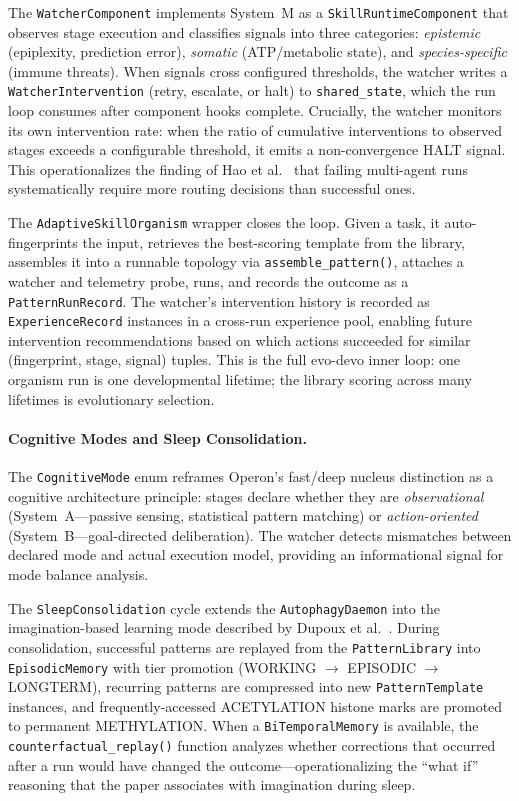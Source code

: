 The \texttt{WatcherComponent} implements System~M as a \texttt{SkillRuntimeComponent} that observes stage execution and classifies signals into three categories: \emph{epistemic} (epiplexity, prediction error), \emph{somatic} (ATP/metabolic state), and \emph{species-specific} (immune threats). When signals cross configured thresholds, the watcher writes a \texttt{WatcherIntervention} (retry, escalate, or halt) to \texttt{shared\_state}, which the run loop consumes after component hooks complete. Crucially, the watcher monitors its own intervention rate: when the ratio of cumulative interventions to observed stages exceeds a configurable threshold, it emits a non-convergence HALT signal. This operationalizes the finding of Hao et al.~\cite{hao2026bigmas} that failing multi-agent runs systematically require more routing decisions than successful ones.

The \texttt{AdaptiveSkillOrganism} wrapper closes the loop. Given a task, it auto-fingerprints the input, retrieves the best-scoring template from the library, assembles it into a runnable topology via \texttt{assemble\_pattern()}, attaches a watcher and telemetry probe, runs, and records the outcome as a \texttt{PatternRunRecord}. The watcher's intervention history is recorded as \texttt{ExperienceRecord} instances in a cross-run experience pool, enabling future intervention recommendations based on which actions succeeded for similar (fingerprint, stage, signal) tuples. This is the full evo-devo inner loop: one organism run is one developmental lifetime; the library scoring across many lifetimes is evolutionary selection.

\paragraph{Cognitive Modes and Sleep Consolidation.}
\label{sec:cognitive-modes}
The \texttt{CognitiveMode} enum reframes Operon's fast/deep nucleus distinction as a cognitive architecture principle: stages declare whether they are \emph{observational} (System~A---passive sensing, statistical pattern matching) or \emph{action-oriented} (System~B---goal-directed deliberation). The watcher detects mismatches between declared mode and actual execution model, providing an informational signal for mode balance analysis.

The \texttt{SleepConsolidation} cycle extends the \texttt{AutophagyDaemon} into the imagination-based learning mode described by Dupoux et al.~\cite{dupoux2026learning}. During consolidation, successful patterns are replayed from the \texttt{PatternLibrary} into \texttt{EpisodicMemory} with tier promotion (WORKING $\to$ EPISODIC $\to$ LONGTERM), recurring patterns are compressed into new \texttt{PatternTemplate} instances, and frequently-accessed ACETYLATION histone marks are promoted to permanent METHYLATION. When a \texttt{BiTemporalMemory} is available, the \texttt{counterfactual\_replay()} function analyzes whether corrections that occurred after a run would have changed the outcome---operationalizing the ``what if'' reasoning that the paper associates with imagination during sleep.

